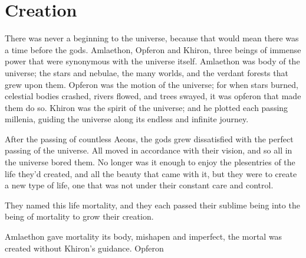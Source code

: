 \documentclass[12pt, a4paper]{book}
\begin{document}
\chapter{Creation}
There was never a beginning to the universe, because that would mean there was a time before the gods. Amlaethon, Opferon and Khiron, three beings of immense power that were synonymous with the universe itself. Amlaethon was body of the universe; the stars and nebulae, the many worlds, and the verdant forests that grew upon them. Opferon was the motion of the universe; for when stars burned, celestial bodies crashed, rivers flowed, and trees swayed, it was opferon that made them do so. Khiron was the spirit of the universe; and he plotted each passing millenia, guiding the universe along its endless and infinite journey.

After the passing of countless Aeons, the gods grew dissatisfied with the perfect passing of the universe. All moved in accordance with their vision, and so all in the universe bored them. No longer was it enough to enjoy the plesentries of the life they'd created, and all the beauty that came with it, but they were to create a new type of life, one that was not under their constant care and control.

They named this life mortality, and they each passed their sublime being into the being of mortality to grow their creation.

Amlaethon gave mortality its body, mishapen and imperfect, the mortal was created without Khiron's guidance. Opferon 
\end{document}
